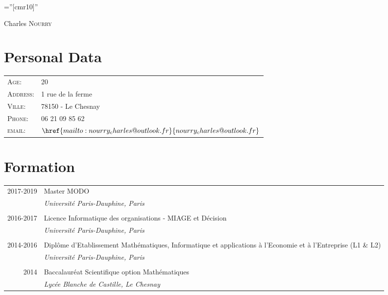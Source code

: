 \documentclass[a4paper,10pt]{article}
\begin{document}

\pagestyle{empty} %

\font\fb=''[cmr10]'' %

\par{%
	\Large
	Charles \textsc{Nourry}
	\bigskip\par}

\section{Personal Data}

\begin{tabular}{ll}
    \textsc{Age:} & 20 \\
    \textsc{Address:}   & 1 rue de la ferme \\
    \textsc{Ville:} 	& 78150 - Le Chesnay\\
    \textsc{Phone:}     & 06 21 09 85 62\\
    \textsc{email:}     & $\href{mailto:nourry_charles@outlook.fr}{nourry_charles@outlook.fr}$
\end{tabular}

\section{Formation}
\begin{tabular}{r|p{11cm}}
 \textsc{2017-2019} & Master MODO \\&\emph{\small{Université Paris-Dauphine, Paris}}\\\multicolumn{2}{c}{} \\
 \textsc{2016-2017} & Licence Informatique des organisations - MIAGE et Décision \\&\emph{\small{Université Paris-Dauphine, Paris}}\\\multicolumn{2}{c}{} \\
 \textsc{2014-2016} & Diplôme d'Etablissement Mathématiques, Informatique et applications à l'Economie et à l'Entreprise (L1 \& L2) \\&\emph{\small{Université Paris-Dauphine, Paris}}\\\multicolumn{2}{c}{} \\
 \textsc{2014} & Baccalauréat Scientifique option Mathématiques \\&\emph{\small{Lycée Blanche de Castille, Le Chesnay}}\\
\end{tabular}
\end{document}

